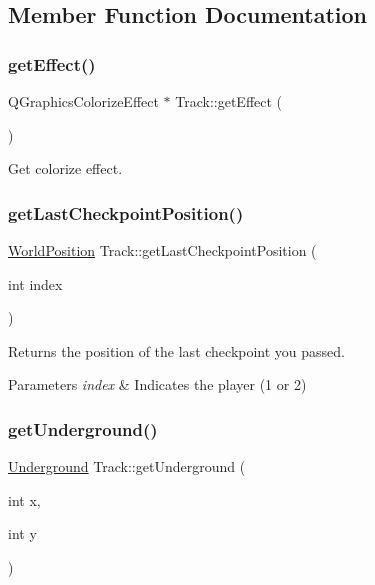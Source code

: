\subsection{Member Function Documentation}
\mbox{\label{class_track_a6dc1474b201e82f4fe7408276d1f0fdf}} 
\subsubsection{\texorpdfstring{getEffect()}{getEffect()}}
{\footnotesize\ttfamily Q\+Graphics\+Colorize\+Effect $\ast$ Track\+::get\+Effect (\begin{DoxyParamCaption}{ }\end{DoxyParamCaption})}



Get colorize effect. 

\mbox{\label{class_track_afab8a8f2ca23861eac3e59c6fddc6647}} 
\subsubsection{\texorpdfstring{getLastCheckpointPosition()}{getLastCheckpointPosition()}}
{\footnotesize\ttfamily \mbox{\hyperlink{class_world_position}{World\+Position}} Track\+::get\+Last\+Checkpoint\+Position (\begin{DoxyParamCaption}\item[{int}]{index }\end{DoxyParamCaption})}



Returns the position of the last checkpoint you passed. 


\begin{DoxyParams}{Parameters}
{\em index} & Indicates the player (1 or 2) \\
\hline
\end{DoxyParams}
\mbox{\label{class_track_a461d8e6729dab9eb3bd2c48cd5c19d5d}} 
\subsubsection{\texorpdfstring{getUnderground()}{getUnderground()}}
{\footnotesize\ttfamily \mbox{\hyperlink{track_8h_ac1404ca5b1e2d42556980919aff64ccc}{Underground}} Track\+::get\+Underground (\begin{DoxyParamCaption}\item[{int}]{x,  }\item[{int}]{y }\end{DoxyParamCaption})}




